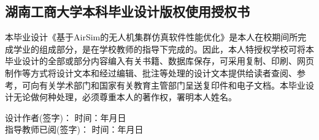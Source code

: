 \begin{titlepage}
    \section*{湖南工商大学本科毕业设计版权使用授权书}
    
    本毕业设计《基于AirSim的无人机集群仿真软件性能优化》是本人在校期间所完成学业的组成部分，是在学校教师的指导下完成的。因此，本人特授权学校可将本毕业设计的全部或部分内容编入有关书籍、数据库保存，可采用复制、印刷、网页制作等方式将设计文本和经过编辑、批注等处理的设计文本提供给读者查阅、参考，可向有关学术部门和国家有关教育主管部门呈送复印件和电子文档。本毕业设计无论做何种处理，必须尊重本人的著作权，署明本人姓名。
    
    \vspace{2cm}
    \begin{flushright}
        设计作者(签字)：\underline{\hspace{3cm}} \hspace{1cm} 时间：\underline{\hspace{2cm}}年\underline{\hspace{1cm}}月\underline{\hspace{1cm}}日\\
        \vspace{1cm}
        指导教师已阅(签字)：\underline{\hspace{3cm}} \hspace{1cm} 时间：\underline{\hspace{2cm}}年\underline{\hspace{1cm}}月\underline{\hspace{1cm}}日
    \end{flushright}
\end{titlepage}
